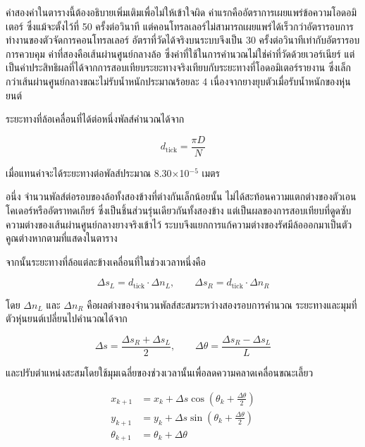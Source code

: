 \documentclass[a4paper,12pt]{report}
\begin{document}
ค่าสองค่าในตารางนี้ต้องอธิบายเพิ่มเติมเพื่อไม่ให้เข้าใจผิด
ค่าแรกคืออัตราการเผยแพร่ข้อความโอดอมิเตอร์ ซึ่งแม้จะตั้งไว้ที่ 50 ครั้งต่อวินาที
แต่คอนโทรลเลอร์ไม่สามารถเผยแพร่ได้เร็วกว่าอัตรารอบการทำงานของตัวจัดการคอนโทรลเลอร์
อัตราที่วัดได้จริงบนระบบจึงเป็น 30 ครั้งต่อวินาทีเท่ากับอัตรารอบการควบคุม
ค่าที่สองคือเส้นผ่านศูนย์กลางล้อ ซึ่งค่าที่ใช้ในการคำนวณไม่ใช่ค่าที่วัดด้วยเวอร์เนียร์
แต่เป็นค่าประสิทธิผลที่ได้จากการสอบเทียบระยะทางจริงเทียบกับระยะทางที่โอดอมิเตอร์รายงาน
ซึ่งเล็กกว่าเส้นผ่านศูนย์กลางขณะไม่รับน้ำหนักประมาณร้อยละ 4
เนื่องจากยางยุบตัวเมื่อรับน้ำหนักของหุ่นยนต์

ระยะทางที่ล้อเคลื่อนที่ได้ต่อหนึ่งพัลส์คำนวณได้จาก

\begin{equation}
d_{\text{tick}} = \frac{\pi D}{N}
\end{equation}

เมื่อแทนค่าจะได้ระยะทางต่อพัลส์ประมาณ 8.30$\times$10$^{-5}$ เมตร

อนึ่ง จำนวนพัลส์ต่อรอบของล้อทั้งสองข้างที่ต่างกันเล็กน้อยนั้น
ไม่ได้สะท้อนความแตกต่างของตัวเอนโคเดอร์หรืออัตราทดเกียร์
ซึ่งเป็นชิ้นส่วนรุ่นเดียวกันทั้งสองข้าง
แต่เป็นผลของการสอบเทียบที่ดูดซับความต่างของเส้นผ่านศูนย์กลางยางจริงเข้าไว้
ระบบจึงแยกการแก้ความต่างของรัศมีล้อออกมาเป็นตัวคูณต่างหากตามที่แสดงในตาราง

จากนั้นระยะทางที่ล้อแต่ละข้างเคลื่อนที่ในช่วงเวลาหนึ่งคือ

\begin{equation}
\Delta s_L = d_{\text{tick}} \cdot \Delta n_L, \qquad
\Delta s_R = d_{\text{tick}} \cdot \Delta n_R
\end{equation}

โดย $\Delta n_L$ และ $\Delta n_R$ คือผลต่างของจำนวนพัลส์สะสมระหว่างสองรอบการคำนวณ
ระยะทางและมุมที่ตัวหุ่นยนต์เปลี่ยนไปคำนวณได้จาก

\begin{equation}
\Delta s = \frac{\Delta s_R + \Delta s_L}{2}, \qquad
\Delta \theta = \frac{\Delta s_R - \Delta s_L}{L}
\end{equation}

และปรับตำแหน่งสะสมโดยใช้มุมเฉลี่ยของช่วงเวลานั้นเพื่อลดความคลาดเคลื่อนขณะเลี้ยว

\begin{equation}
\begin{aligned}
x_{k+1} &= x_k + \Delta s \cos\left(\theta_k + \frac{\Delta \theta}{2}\right) \\
y_{k+1} &= y_k + \Delta s \sin\left(\theta_k + \frac{\Delta \theta}{2}\right) \\
\theta_{k+1} &= \theta_k + \Delta \theta
\end{aligned}
\end{equation}
\end{document}
